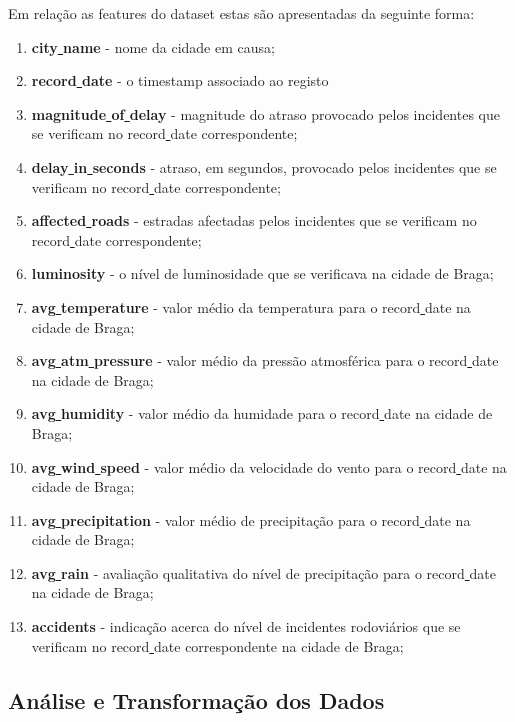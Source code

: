 \documentclass[a4paper,10pt]{article}
\begin{document}
Em relação as features do dataset estas são apresentadas da seguinte forma:

\begin{enumerate}
	\item \textbf{city\underline{ }name} - nome da cidade em causa;
	\item \textbf{record\underline{ }date} - o timestamp associado ao registo
	\item \textbf{magnitude\underline{ }of\underline{ }delay} - magnitude do atraso provocado pelos incidentes que se verificam no record\underline{ }date correspondente;
	\item \textbf{delay\underline{ }in\underline{ }seconds}  -  atraso, em segundos, provocado pelos incidentes que se verificam no record\underline{ }date correspondente;
	\item \textbf{affected\underline{ }roads} - estradas afectadas pelos incidentes que se verificam no record\underline{ }date correspondente;
	\item \textbf{luminosity} - o nível de luminosidade que se verificava na cidade de Braga;
	\item \textbf{avg\underline{ }temperature} - valor médio da temperatura para o record\underline{ }date na cidade de Braga;
	\item \textbf{avg\underline{ }atm\underline{ }pressure} - valor médio da pressão atmosférica para o record\underline{ }date na cidade de Braga;
	\item \textbf{avg\underline{ }humidity} - valor médio da humidade para o record\underline{ }date na cidade de Braga;
	\item \textbf{avg\underline{ }wind\underline{ }speed} - valor médio da velocidade do vento para o record\underline{ }date na cidade de Braga;
	\item \textbf{avg\underline{ }precipitation} - valor médio de precipitação para o record\underline{ }date na cidade de Braga;
	\item \textbf{avg\underline{ }rain} - avaliação qualitativa do nível de precipitação para o record\underline{ }date na cidade de Braga;
	\item \textbf{accidents} - indicação acerca do nível de incidentes rodoviários que se verificam no record\underline{ }date correspondente na cidade de Braga;
\end{enumerate}

\newpage

\subsection{Análise e Transformação dos Dados}
\end{document}
